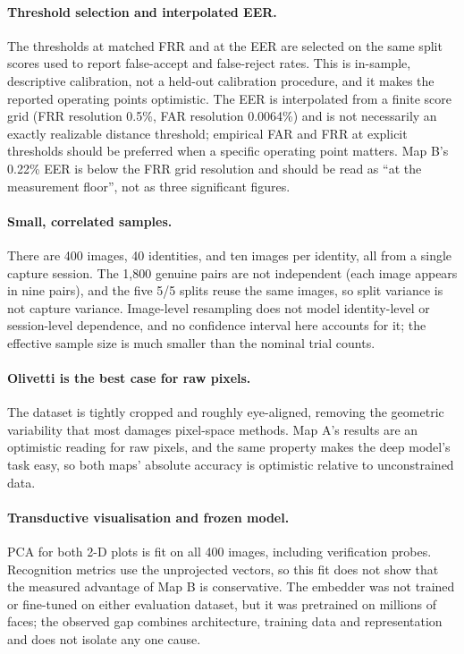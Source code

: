 \paragraph{Threshold selection and interpolated EER.} The thresholds at matched FRR and at the EER are selected on the same split scores used to report false-accept and false-reject rates. This is in-sample, descriptive calibration, not a held-out calibration procedure, and it makes the reported operating points optimistic. The EER is interpolated from a finite score grid (FRR resolution 0.5\%, FAR resolution 0.0064\%) and is not necessarily an exactly realizable distance threshold; empirical FAR and FRR at explicit thresholds should be preferred when a specific operating point matters. Map B's 0.22\% EER is below the FRR grid resolution and should be read as ``at the measurement floor'', not as three significant figures.

\paragraph{Small, correlated samples.} There are 400 images, 40 identities, and ten images per identity, all from a single capture session. The 1,800 genuine pairs are not independent (each image appears in nine pairs), and the five 5/5 splits reuse the same images, so split variance is not capture variance. Image-level resampling does not model identity-level or session-level dependence, and no confidence interval here accounts for it; the effective sample size is much smaller than the nominal trial counts.

\paragraph{Olivetti is the best case for raw pixels.} The dataset is tightly cropped and roughly eye-aligned, removing the geometric variability that most damages pixel-space methods. Map A's results are an optimistic reading for raw pixels, and the same property makes the deep model's task easy, so both maps' absolute accuracy is optimistic relative to unconstrained data.

\paragraph{Transductive visualisation and frozen model.} PCA for both 2-D plots is fit on all 400 images, including verification probes. Recognition metrics use the unprojected vectors, so this fit does not show that the measured advantage of Map B is conservative. The embedder was not trained or fine-tuned on either evaluation dataset, but it was pretrained on millions of faces; the observed gap combines architecture, training data and representation and does not isolate any one cause.

